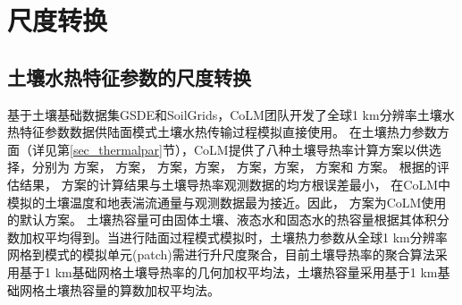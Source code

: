 \chapter{尺度转换}\label{尺度转换}

\section{土壤水热特征参数的尺度转换}\label{土壤水热特征参数及尺度转换}

基于土壤基础数据集GSDE和SoilGrids，CoLM团队开发了全球1 km分辨率土壤水热特征参数数据供陆面模式土壤水热传输过程模拟直接使用。
在土壤热力参数方面（详见第\ref{sec_thermalpar}节），CoLM提供了八种土壤导热率计算方案以供选择，分别为 \citet{farouki1981thermal}方案，\citet{Johansen1975} 方案，
\citet{cote2005} 方案，\citet{balland2005}方案，\citet{lu2007improved} 方案，\citet{Yan2019thermal}方案，\citet{tarnawski2012series} 方案和 \citet{de1963thermal} 方案。
根据\citet{dai2019evaluation}的评估结果，\citet{balland2005} 方案的计算结果与土壤导热率观测数据的均方根误差最小，
在CoLM中模拟的土壤温度和地表湍流通量与观测数据最为接近。因此，\citet{balland2005} 方案为CoLM使用的默认方案。
土壤热容量可由固体土壤、液态水和固态水的热容量根据其体积分数加权平均得到。当进行陆面过程模式模拟时，土壤热力参数从全球1 km分辨率网格到模式的模拟单元(patch)需进行升尺度聚合，目前土壤导热率的聚合算法采用基于1 km基础网格土壤导热率的几何加权平均法，土壤热容量采用基于1 km基础网格土壤热容量的算数加权平均法。

